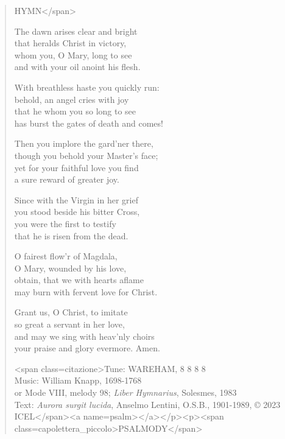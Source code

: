 \hymn

\begin{verse}
HYMN</span>

The dawn arises clear and bright\\
that heralds Christ in victory,\\
whom you, O Mary, long to see\\
and with your oil anoint his flesh.

With breathless haste you quickly run:\\
behold, an angel cries with joy\\
that he whom you so long to see\\
has burst the gates of death and comes!

Then you implore the gard’ner there,\\
though you behold your Master’s face;\\
yet for your faithful love you find\\
a sure reward of greater joy.

Since with the Virgin in her grief\\
you stood beside his bitter Cross,\\
you were the first to testify\\
that he is risen from the dead.

O fairest flow’r of Magdala,\\
O Mary, wounded by his love,\\
obtain, that we with hearts aflame\\
may burn with fervent love for Christ.

Grant us, O Christ, to imitate\\
so great a servant in her love,\\
and may we sing with heav’nly choirs\\
your praise and glory evermore. Amen.

<span class=citazione>Tune: WAREHAM, 8 8 8 8\\
Music: William Knapp, 1698-1768\\
or Mode VIII, melody 98; \emph{Liber Hymnarius}, Solesmes, 1983\\
Text: \emph{Aurora surgit lucida}, Anselmo Lentini, O.S.B., 1901-1989, © 2023 ICEL</span><a name=psalm></a></p><p><span class=capolettera_piccolo>PSALMODY</span>
\end{verse}

\begin{hymnsource}

\end{hymnsource}